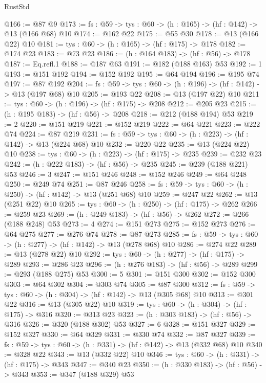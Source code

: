\begin{lexlean}{RustStd}
\begin{coremodule}
@166 := @87 @9
@173 := {fs : @59} -> {tys : @60} -> (h : @165) -> (hf : @142) -> @13 (@166 @68) @10
@174 := @162 @22
@175 := @55 @30
@178 := @13 (@166 @22) @10
@181 := {tys : @60} -> (h : @165) -> (hf : @175) -> @178
@182 := @174 @23
@183 := @73 @23
@186 := (h : @164 @183) -> (hf : @56) -> @178
@187 := Eq.refl.{1}
@188 := @187 @63
@191 := @182 (@188 @163) @53
@192 := 1
@193 := @151 @192
@194 := @152 @192
@195 := @64 @194
@196 := @195 @74
@197 := @87 @192
@204 := {fs : @59} -> {tys : @60} -> (h : @196) -> (hf : @142) -> @13 (@197 @68) @10
@205 := @193 @22
@208 := @13 (@197 @22) @10
@211 := {tys : @60} -> (h : @196) -> (hf : @175) -> @208
@212 := @205 @23
@215 := (h : @195 @183) -> (hf : @56) -> @208
@218 := @212 (@188 @194) @53
@219 := 2
@220 := @151 @219
@221 := @152 @219
@222 := @64 @221
@223 := @222 @74
@224 := @87 @219
@231 := {fs : @59} -> {tys : @60} -> (h : @223) -> (hf : @142) -> @13 (@224 @68) @10
@232 := @220 @22
@235 := @13 (@224 @22) @10
@238 := {tys : @60} -> (h : @223) -> (hf : @175) -> @235
@239 := @232 @23
@242 := (h : @222 @183) -> (hf : @56) -> @235
@245 := @239 (@188 @221) @53
@246 := 3
@247 := @151 @246
@248 := @152 @246
@249 := @64 @248
@250 := @249 @74
@251 := @87 @246
@258 := {fs : @59} -> {tys : @60} -> (h : @250) -> (hf : @142) -> @13 (@251 @68) @10
@259 := @247 @22
@262 := @13 (@251 @22) @10
@265 := {tys : @60} -> (h : @250) -> (hf : @175) -> @262
@266 := @259 @23
@269 := (h : @249 @183) -> (hf : @56) -> @262
@272 := @266 (@188 @248) @53
@273 := 4
@274 := @151 @273
@275 := @152 @273
@276 := @64 @275
@277 := @276 @74
@278 := @87 @273
@285 := {fs : @59} -> {tys : @60} -> (h : @277) -> (hf : @142) -> @13 (@278 @68) @10
@286 := @274 @22
@289 := @13 (@278 @22) @10
@292 := {tys : @60} -> (h : @277) -> (hf : @175) -> @289
@293 := @286 @23
@296 := (h : @276 @183) -> (hf : @56) -> @289
@299 := @293 (@188 @275) @53
@300 := 5
@301 := @151 @300
@302 := @152 @300
@303 := @64 @302
@304 := @303 @74
@305 := @87 @300
@312 := {fs : @59} -> {tys : @60} -> (h : @304) -> (hf : @142) -> @13 (@305 @68) @10
@313 := @301 @22
@316 := @13 (@305 @22) @10
@319 := {tys : @60} -> (h : @304) -> (hf : @175) -> @316
@320 := @313 @23
@323 := (h : @303 @183) -> (hf : @56) -> @316
@326 := @320 (@188 @302) @53
@327 := 6
@328 := @151 @327
@329 := @152 @327
@330 := @64 @329
@331 := @330 @74
@332 := @87 @327
@339 := {fs : @59} -> {tys : @60} -> (h : @331) -> (hf : @142) -> @13 (@332 @68) @10
@340 := @328 @22
@343 := @13 (@332 @22) @10
@346 := {tys : @60} -> (h : @331) -> (hf : @175) -> @343
@347 := @340 @23
@350 := (h : @330 @183) -> (hf : @56) -> @343
@353 := @347 (@188 @329) @53

\end{coremodule}
\end{lexlean}
